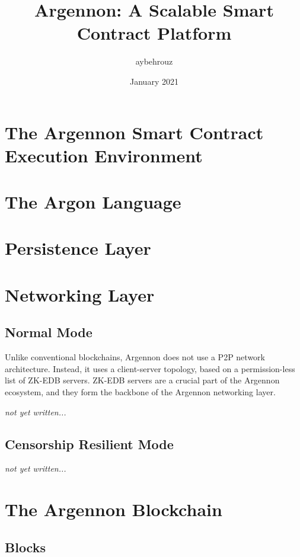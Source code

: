 \documentclass[11pt, a4paper]{report}
\title{Argennon: A Scalable Smart Contract Platform}
\author{aybehrouz}
\date{January 2021}
\newcommand{\note}[1] {
    \begin{tcolorbox}[colframe=white,colback=white]
        \emph{#1}
    \end{tcolorbox}
}
\begin{document}
    \tableofcontents


    \chapter{The Argennon Smart Contract Execution Environment}\label{ch:AVM}
    


    \chapter{The Argon Language}\label{ch:argon-lang}
    



    \chapter{Persistence Layer}\label{ch:persistance}
    


    \chapter{Networking Layer}\label{ch:networking}
    \section{Normal Mode}\label{sec:normal-mode}
    Unlike conventional blockchains, Argennon does not use a P2P network architecture. Instead, it uses a
    client-server topology, based on a permission-less list of ZK-EDB servers. ZK-EDB servers are a
    crucial part of the Argennon ecosystem, and they form the backbone of the Argennon networking layer.
    \note{not yet written...}


    \section{Censorship Resilient Mode}\label{sec:cens-res-mode}
    \note{not yet written...}


    \chapter{The Argennon Blockchain}\label{ch:argennon-blockchain}
    


    \section{Blocks}\label{sec:blocks}
    
\end{document}
